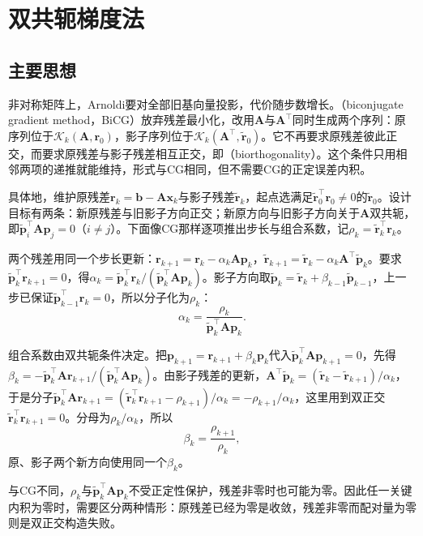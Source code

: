 \section{双共轭梯度法}
\label{sec:ls-bicg}

\subsection{主要思想}

非对称矩阵上，Arnoldi要对全部旧基向量投影，代价随步数增长。（biconjugate gradient method，BiCG）放弃残差最小化，改用$\bm A$与$\bm A^\top$同时生成两个序列：原序列位于$\mathcal K_k(\bm A,\bm r_0)$，影子序列位于$\mathcal K_k(\bm A^\top,\widetilde{\bm r}_0)$。它不再要求原残差彼此正交，而要求原残差与影子残差相互正交，即（biorthogonality）。这个条件只用相邻两项的递推就能维持，形式与CG相同，但不需要CG的正定误差内积。

具体地，维护原残差$\bm r_k=\bm b-\bm A\bm x_k$与影子残差$\widetilde{\bm r}_k$，起点选满足$\widetilde{\bm r}_0^\top\bm r_0\ne0$的$\widetilde{\bm r}_0$。设计目标有两条：新原残差与旧影子方向正交；新原方向与旧影子方向关于$\bm A$双共轭，即$\widetilde{\bm p}_i^\top\bm A\bm p_j=0$（$i\ne j$）。下面像CG那样逐项推出步长与组合系数，记$\rho_k=\widetilde{\bm r}_k^\top\bm r_k$。

两个残差用同一个步长更新：$\bm r_{k+1}=\bm r_k-\alpha_k\bm A\bm p_k$，$\widetilde{\bm r}_{k+1}=\widetilde{\bm r}_k-\alpha_k\bm A^\top\widetilde{\bm p}_k$。要求$\widetilde{\bm p}_k^\top\bm r_{k+1}=0$，得$\alpha_k=\widetilde{\bm p}_k^\top\bm r_k/(\widetilde{\bm p}_k^\top\bm A\bm p_k)$。影子方向取$\widetilde{\bm p}_k=\widetilde{\bm r}_k+\beta_{k-1}\widetilde{\bm p}_{k-1}$，上一步已保证$\widetilde{\bm p}_{k-1}^\top\bm r_k=0$，所以分子化为$\rho_k$：
\[
 \alpha_k=\frac{\rho_k}{\widetilde{\bm p}_k^\top\bm A\bm p_k}.
\]

组合系数由双共轭条件决定。把$\bm p_{k+1}=\bm r_{k+1}+\beta_k\bm p_k$代入$\widetilde{\bm p}_k^\top\bm A\bm p_{k+1}=0$，先得$\beta_k=-\widetilde{\bm p}_k^\top\bm A\bm r_{k+1}/(\widetilde{\bm p}_k^\top\bm A\bm p_k)$。由影子残差的更新，$\bm A^\top\widetilde{\bm p}_k=(\widetilde{\bm r}_k-\widetilde{\bm r}_{k+1})/\alpha_k$，于是分子$\widetilde{\bm p}_k^\top\bm A\bm r_{k+1}=(\widetilde{\bm r}_k^\top\bm r_{k+1}-\rho_{k+1})/\alpha_k=-\rho_{k+1}/\alpha_k$，这里用到双正交$\widetilde{\bm r}_k^\top\bm r_{k+1}=0$。分母为$\rho_k/\alpha_k$，所以
\[
 \beta_k=\frac{\rho_{k+1}}{\rho_k},
\]
原、影子两个新方向使用同一个$\beta_k$。

与CG不同，$\rho_k$与$\widetilde{\bm p}_k^\top\bm A\bm p_k$不受正定性保护，残差非零时也可能为零。因此任一关键内积为零时，需要区分两种情形：原残差已经为零是收敛，残差非零而配对量为零则是双正交构造失败。

